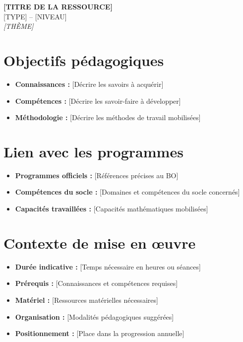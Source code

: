 \documentclass[11pt,a4paper]{article}
\newcommand{\ressourcetitle}[4]{%
  \begin{center}
    {\LARGE\bfseries\color{primarycolor} #1}\\[0.5em]
    {\large #2 -- #3}\\[0.3em]
    {\normalsize\textit{#4}}
  \end{center}
  \vspace{1em}
}
\begin{document}
\ressourcetitle{[TITRE DE LA RESSOURCE]}{[TYPE]}{[NIVEAU]}{[THÈME]}

\section{Objectifs pédagogiques}
\begin{itemize}[leftmargin=*]
  \item \textbf{Connaissances :} [Décrire les savoirs à acquérir]
  \item \textbf{Compétences :} [Décrire les savoir-faire à développer]
  \item \textbf{Méthodologie :} [Décrire les méthodes de travail mobilisées]
\end{itemize}

\section{Lien avec les programmes}
\begin{itemize}[leftmargin=*]
  \item \textbf{Programmes officiels :} [Références précises au BO]
  \item \textbf{Compétences du socle :} [Domaines et compétences du socle concernés]
  \item \textbf{Capacités travaillées :} [Capacités mathématiques mobilisées]
\end{itemize}

\section{Contexte de mise en œuvre}
\begin{itemize}[leftmargin=*]
  \item \textbf{Durée indicative :} [Temps nécessaire en heures ou séances]
  \item \textbf{Prérequis :} [Connaissances et compétences requises]
  \item \textbf{Matériel :} [Ressources matérielles nécessaires]
  \item \textbf{Organisation :} [Modalités pédagogiques suggérées]
  \item \textbf{Positionnement :} [Place dans la progression annuelle]
\end{itemize}
\end{document}
